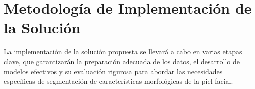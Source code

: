 \section{Metodología de Implementación de la Solución}




La implementación de la solución propuesta se llevará a cabo en varias etapas clave, que garantizarán la preparación adecuada de los datos, el desarrollo de modelos efectivos y su evaluación rigurosa para abordar las necesidades específicas de segmentación de características morfológicas de la piel facial.

